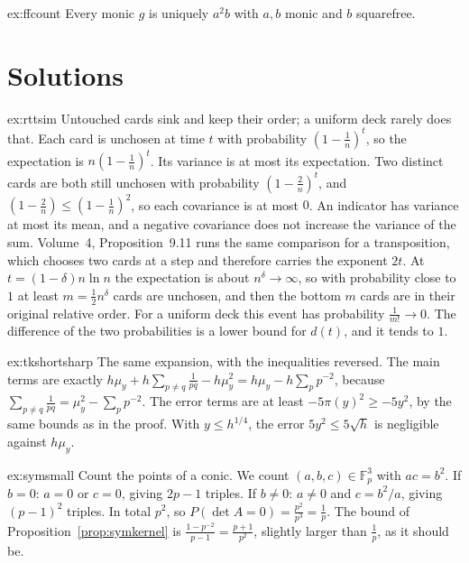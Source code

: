 \begin{hint}{ex:ffcount}
Every monic $g$ is uniquely $a^2b$ with $a,b$ monic and $b$ squarefree.
\end{hint}

\section{Solutions}

\begin{solution}{ex:rttsim}
\idea Untouched cards sink and keep their order; a uniform deck rarely does that.
\writeup Each card is unchosen at time $t$ with probability $(1-\frac1n)^t$, so the expectation is $n(1-\frac1n)^t$. Its variance is at most its expectation. Two distinct cards are both still unchosen with probability $(1-\frac2n)^t$, and $(1-\frac2n)\le(1-\frac1n)^2$, so each covariance is at most $0$. An indicator has variance at most its mean, and a negative covariance does not increase the variance of the sum. Volume~4, Proposition~9.11 runs the same comparison for a transposition, which chooses two cards at a step and therefore carries the exponent $2t$. At $t=(1-\delta)n\ln n$ the expectation is about $n^\delta\to\infty$, so with probability close to $1$ at least $m=\frac12n^{\delta}$ cards are unchosen, and then the bottom $m$ cards are in their original relative order. For a uniform deck this event has probability $\frac1{m!}\to0$. The difference of the two probabilities is a lower bound for $d(t)$, and it tends to $1$.
\end{solution}

\begin{solution}{ex:tkshortsharp}
\idea The same expansion, with the inequalities reversed.
\writeup The main terms are exactly $h\mu_y+h\sum_{p\ne q}\frac1{pq}-h\mu_y^2=h\mu_y-h\sum_pp^{-2}$, because $\sum_{p\ne q}\frac1{pq}=\mu_y^2-\sum_pp^{-2}$. The error terms are at least $-5\pi(y)^2\ge-5y^2$, by the same bounds as in the proof. With $y\le h^{1/4}$, the error $5y^2\le5\sqrt h$ is negligible against $h\mu_y$.
\end{solution}

\begin{solution}{ex:symsmall}
\idea Count the points of a conic.
\writeup We count $(a,b,c)\in\mathbb F_p^3$ with $ac=b^2$. If $b=0$: $a=0$ or $c=0$, giving $2p-1$ triples. If $b\ne0$: $a\ne0$ and $c=b^2/a$, giving $(p-1)^2$ triples. In total $p^2$, so $P(\det A=0)=\frac{p^2}{p^3}=\frac1p$. The bound of Proposition~\ref{prop:symkernel} is $\frac{1-p^{-2}}{p-1}=\frac{p+1}{p^2}$, slightly larger than $\frac1p$, as it should be.
\end{solution}

